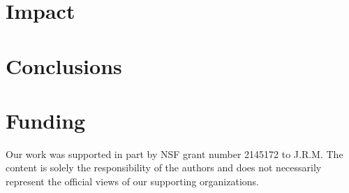 \documentclass[preprint,12pt, a4paper]{elsarticle}
\begin{document}


\section{Impact}








\section{Conclusions}


\section*{Funding}
Our work was supported in part by NSF grant number 2145172 to J.R.M. The content is solely the responsibility of the authors and does not necessarily represent the official views of our supporting organizations.
\end{document}
